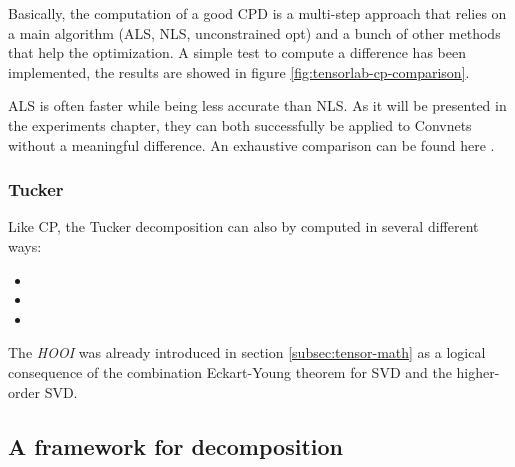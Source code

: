 Basically, the computation of a good CPD is a multi-step approach that relies on a main algorithm (ALS, NLS, unconstrained opt) and a bunch of other methods that help the optimization. 
A simple test to compute a difference has been implemented, the results are showed in figure \ref{fig:tensorlab-cp-comparison}.
\newline 

ALS is often faster while being less accurate than NLS. As it will be presented in the experiments chapter, they can both successfully be applied to Convnets without a meaningful difference. 
An exhaustive comparison can be found here \parencite{WCPD-talk}. 

\subsubsection{Tucker}
Like CP, the Tucker decomposition can also by computed in several different ways: 
\begin{itemize}
    \item 
    
    \item 
    
    \item 
\end{itemize}

The \emph{HOOI} was already introduced in section \ref{subsec:tensor-math} as a logical consequence of the combination Eckart-Young theorem for SVD and the higher-order SVD. 
\subsection{A framework for decomposition}
\label{subsec:framework}




\begin{comment}
\bigskip

\begin{figure}
\centering
\begin{subfigure}{.5\textwidth}
  \centering
 \texttt{[image: \\path/cifar-tanh.png]} 
  \caption{Acc.= \textasciitilde 65\% f. di attivazione = TanH}
 \label{fig:training}
\end{subfigure}%
\begin{subfigure}{.5\textwidth}
  \centering
 \texttt{[image: \\path/cifar-relu.png]} 
  \caption{Acc.= \textasciitilde 73\% f. di attivazione = ReLU}
 \label{fig:validation}
\end{subfigure}
\caption{Percentuali di accuracy a seconda della funzione d'attivazione. La ReLU produce indubbiamente risultati migliori.}
\label{fig:relu}
\end{figure}
\end{comment}


